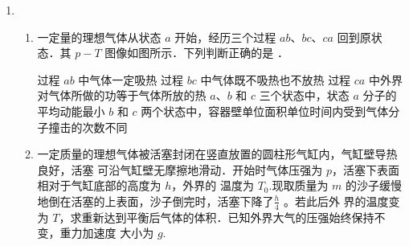 

\begin{enumerate}
	\item
{}
\begin{enumerate}
	\item
一定量的理想气体从状态 $ a $ 开始，经历三个过程 $ ab $、$ bc $、$ ca $ 回到原状态．其 $ p - T $
图像如图所示．下列判断正确的是 \underlinegap ．
\begin{figure}[h!]
	\centering
	
\end{figure}

\fivechoices
{过程 $ ab $ 中气体一定吸热}
{过程 $ bc $ 中气体既不吸热也不放热}
{过程 $ ca $ 中外界对气体所做的功等于气体所放的热}
{$ a $、$ b $ 和 $ c $ 三个状态中，状态 $ a $ 分子的平均动能最小}
{$ b $ 和 $ c $ 两个状态中，容器壁单位面积单位时间内受到气体分子撞击的次数不同}





\item 
一定质量的理想气体被活塞封闭在竖直放置的圆柱形气缸内，气缸壁导热良好，活塞
可沿气缸壁无摩擦地滑动．开始时气体压强为 $ p $，活塞下表面相对于气缸底部的高度为 $ h $，外界的
温度为 $ T_{0} $.现取质量为 $ m $ 的沙子缓慢地倒在活塞的上表面，沙子倒完时，活塞下降了$ \frac{h}{4} $ 。若此后外
界的温度变为 $ T $，求重新达到平衡后气体的体积．已知外界大气的压强始终保持不变，重力加速度
大小为 $ g $.


	
\end{enumerate}




\end{enumerate}
